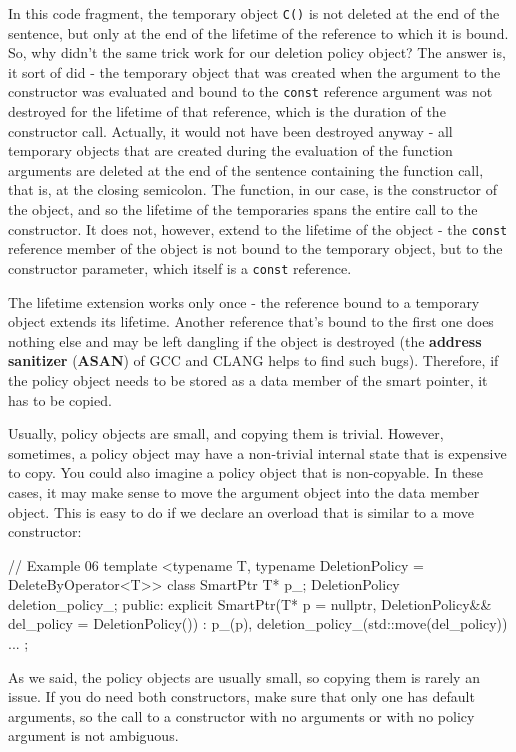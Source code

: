 In this code fragment, the temporary object \texttt{C()} is not deleted at the end of the sentence, but only at the end of the lifetime of the reference to which it is bound. So, why didn't the same trick work for our deletion policy object? The answer is, it sort of did - the temporary object that was created when the argument to the constructor was evaluated and bound to the \texttt{const} reference argument was not destroyed for the lifetime of that reference, which is the duration of the constructor call. Actually, it would not have been destroyed anyway - all temporary objects that are created during the evaluation of the function arguments are deleted at the end of the sentence containing the function call, that is, at the closing semicolon. The function, in our case, is the constructor of the object, and so the lifetime of the temporaries spans the entire call to the constructor. It does not, however, extend to the lifetime of the object - the \texttt{const} reference member of the object is not bound to the temporary object, but to the constructor parameter, which itself is a \texttt{const} reference.

The lifetime extension works only once - the reference bound to a temporary object extends its lifetime. Another reference that's bound to the first one does nothing else and may be left dangling if the object is destroyed (the \textbf{address sanitizer} (\textbf{ASAN}) of GCC and CLANG helps to find such bugs). Therefore, if the policy object needs to be stored as a data member of the smart pointer, it has to be copied.

Usually, policy objects are small, and copying them is trivial. However, sometimes, a policy object may have a non-trivial internal state that is expensive to copy. You could also imagine a policy object that is non-copyable. In these cases, it may make sense to move the argument object into the data member object. This is easy to do if we declare an overload that is similar to a move constructor:

\begin{code}
// Example 06
template <typename T,
          typename DeletionPolicy = DeleteByOperator<T>>
class SmartPtr {
  T* p_;
  DeletionPolicy deletion_policy_;
  public:
  explicit SmartPtr(T* p = nullptr,
      DeletionPolicy&& del_policy = DeletionPolicy())
    : p_(p), deletion_policy_(std::move(del_policy))
  {}
  ...
};
\end{code}

As we said, the policy objects are usually small, so copying them is rarely an issue. If you do need both constructors, make sure that only one has default arguments, so the call to a constructor with no arguments or with no policy argument is not ambiguous.

